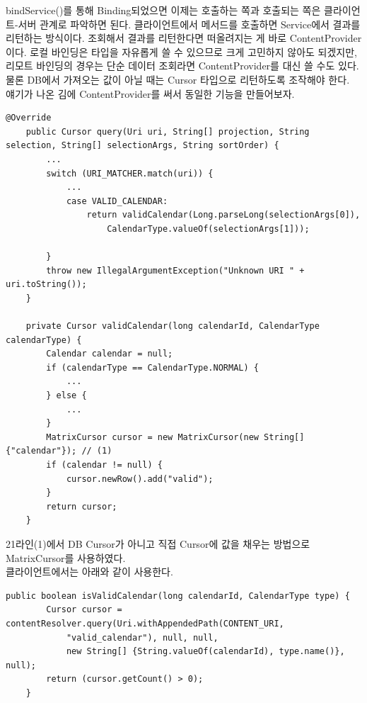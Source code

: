 bindService()를 통해 Binding되었으면 이제는 호출하는 쪽과 호출되는 쪽은 클라이언트-서버 관계로 파악하면 된다. 클라이언트에서 메서드를 호출하면 Service에서 결과를 리턴하는 방식이다. 
조회해서 결과를 리턴한다면 떠올려지는 게 바로 ContentProvider이다. 로컬 바인딩은 타입을 자유롭게 쓸 수 있으므로 크게 고민하지 않아도 되겠지만, 리모트 바인딩의 경우는 단순 데이터 조회라면 ContentProvider를 대신 쓸 수도 있다. 물론 DB에서 가져오는 값이 아닐 때는 Cursor 타입으로 리턴하도록 조작해야 한다.\\

얘기가 나온 김에 ContentProvider를 써서 동일한 기능을 만들어보자.
\begin{lstlisting}[frame=single]
	@Override
	public Cursor query(Uri uri, String[] projection, String selection, String[] selectionArgs, String sortOrder) {
		...
		switch (URI_MATCHER.match(uri)) {
			...
			case VALID_CALENDAR:
				return validCalendar(Long.parseLong(selectionArgs[0]), 
					CalendarType.valueOf(selectionArgs[1]));
				
		}
		throw new IllegalArgumentException("Unknown URI " + uri.toString());
	}

	private Cursor validCalendar(long calendarId, CalendarType calendarType) {
		Calendar calendar = null;
		if (calendarType == CalendarType.NORMAL) {
			...
		} else {
			...
		}
		MatrixCursor cursor = new MatrixCursor(new String[] {"calendar"}); // (1)
		if (calendar != null) {
			cursor.newRow().add("valid");
		}
		return cursor;
	}
\end{lstlisting}
21라인(1)에서 DB Cursor가 아니고 직접 Cursor에 값을 채우는 방법으로 MatrixCursor를 사용하였다.\\

클라이언트에서는 아래와 같이 사용한다.
\begin{lstlisting}[frame=single]
	public boolean isValidCalendar(long calendarId, CalendarType type) {
		Cursor cursor = contentResolver.query(Uri.withAppendedPath(CONTENT_URI, 
			"valid_calendar"), null, null, 
			new String[] {String.valueOf(calendarId), type.name()}, null);
		return (cursor.getCount() > 0);
	}
\end{lstlisting}

